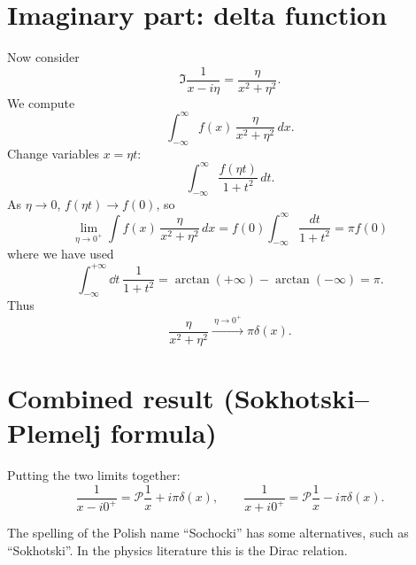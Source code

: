 \documentclass{article}
\theoremstyle{definition}
\theoremstyle{plain}
\numberwithin{equation}{section}
\begin{document}
\section{Imaginary part: delta function}

Now consider
\begin{equation}
\Im \frac{1}{x-i\eta} = \frac{\eta}{x^2+\eta^2}.
\end{equation}
We compute
\begin{equation}
\int_{-\infty}^{\infty} f(x)\,\frac{\eta}{x^2+\eta^2}\,dx.
\end{equation}
Change variables $x = \eta t$:
\begin{equation}
\int_{-\infty}^{\infty} \frac{f(\eta t)}{1+t^2}\,dt.
\end{equation}
As $\eta \to 0$, $f(\eta t)\to f(0)$, so
\begin{equation}
\lim_{\eta\to0^+}\int f(x)\,\frac{\eta}{x^2+\eta^2}\,dx = f(0)\int_{-\infty}^{\infty}\frac{dt}{1+t^2} = \pi f(0)
\end{equation}
where we have used
\[
    \int _{-\infty} ^{+\infty} \dd t\ 
    \frac{1}{1+t^{2}} 
    =
    \arctan(+\infty) - \arctan(-\infty)
    = \pi.
\]
Thus
\begin{equation}
\frac{\eta}{x^2+\eta^2} \xrightarrow{\ \eta \to 0^+\ } \pi \delta(x).
\end{equation}

\section{Combined result (Sokhotski--Plemelj formula)}

Putting the two limits together:
\begin{equation}
\frac{1}{x-i0^+} = \mathcal{P}\frac{1}{x} + i\pi \delta(x), \qquad
\frac{1}{x+i0^+} = \mathcal{P}\frac{1}{x} - i\pi \delta(x).
\end{equation}

The spelling of the Polish name ``Sochocki'' has some alternatives, 
such as ``Sokhotski''. In the physics literature this is the Dirac relation. 
\end{document}
